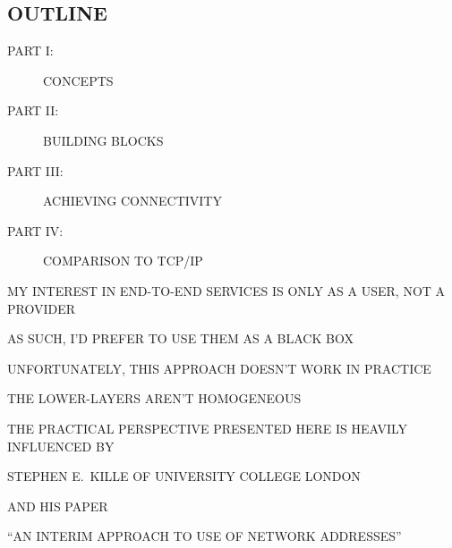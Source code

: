 


\begin{bwslide}
\part*	{OUTLINE}\bf

\begin{description}
\item[PART I:]		CONCEPTS

\item[PART II:]		BUILDING BLOCKS

\item[PART III:]	ACHIEVING CONNECTIVITY

\item[PART IV:]		COMPARISON TO TCP/IP
\end{description}
\end{bwslide}


\begin{bwslide}

\begin{nrtc}
\item	MY INTEREST IN END-TO-END SERVICES IS ONLY AS A USER,
	NOT A PROVIDER

\item	AS SUCH, I'D PREFER TO USE THEM AS A BLACK BOX

\item	UNFORTUNATELY, THIS APPROACH DOESN'T WORK IN PRACTICE
    \begin{nrtc}
    \item	THE LOWER-LAYERS AREN'T HOMOGENEOUS
    \end{nrtc}

\item	THE PRACTICAL PERSPECTIVE PRESENTED HERE IS HEAVILY INFLUENCED BY
    \begin{nrtc}
    \item	STEPHEN E.~KILLE OF UNIVERSITY COLLEGE LONDON
    \end{nrtc}

\item	AND HIS PAPER
    \begin{nrtc}
    \item	``AN INTERIM APPROACH TO USE OF NETWORK ADDRESSES''
    \end{nrtc}
\end{nrtc}
\end{bwslide}


